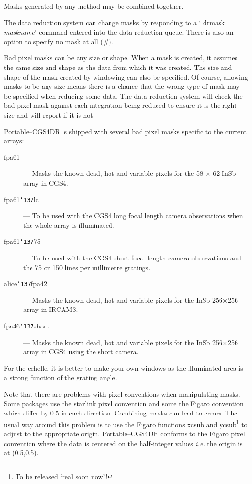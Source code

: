 \documentclass[a4paper]{book}
\renewcommand{\_}{{\tt\char'137}}
\begin{document}
Masks generated by any method may be combined together. 

The data reduction system can change masks by responding to a `{\sc
drmask} {\em maskname}' command entered into the data reduction queue.
There is also an option to specify no mask at all (\#). 

Bad pixel masks can be any size or shape. When a mask is created, it
assumes the same size and shape as the data from which it was created. The
size and shape of the mask created by windowing can also be specified. Of
course, allowing masks to be any size means there is a chance that the
wrong type of mask may be specified when reducing some data. The data
reduction system will check the bad pixel mask against each integration
being reduced to ensure it is the right size and will report if it is not. 

Portable--CGS4DR is shipped with several bad pixel masks specific to the
current arrays: 

\begin{description}
\item[{\sf fpa61}] --- Masks the known dead, hot and variable pixels for the 
58 $\times$ 62 InSb array in CGS4.
\item[{\sf fpa61\_lc}] --- To be used with the CGS4 long focal length camera 
 observations when the whole array is illuminated.
\item[{\sf fpa61\_75}] --- To be used with the CGS4 short focal length camera
 observations and the 75 or 150 lines per millimetre gratings.
\item[{\sf alice\_fpa42}] --- Masks the known dead, hot and variable pixels 
for the InSb 256$\times$256 array in IRCAM3.
\item[{\sf fpa46\_short}] --- Masks the known dead, hot and variable pixels 
for the InSb 256$\times$256 array in CGS4 using the short camera.
\end{description}

For the echelle, it is better to make your own windows as the illuminated area
is a strong function of the grating angle.

Note that there are problems with pixel conventions when manipulating
masks. Some packages use the {\sc starlink} pixel convention and some the Figaro
convention which differ by 0.5 in each direction. Combining masks can lead
to errors. The usual way around this problem is to use the Figaro
functions {\sc xcsub} and {\sc ycsub}\footnote[2]{To be released `real
soon now'!} to adjust to the appropriate origin. Portable--CGS4DR conforms
to the Figaro pixel convention where the data is centered on the
half-integer values {\em i.e.} the origin is at (0.5,0.5). 
\end{document}
